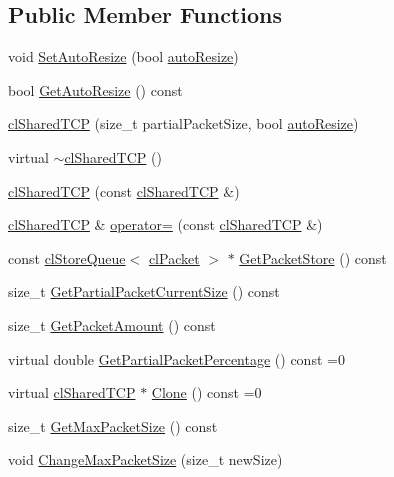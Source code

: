 \subsection*{Public Member Functions}
\begin{DoxyCompactItemize}
\item 
void \hyperlink{classcl_shared_t_c_p_a04c910cf085fe90c1c068e4ab168a7e5}{SetAutoResize} (bool \hyperlink{classcl_shared_t_c_p_aadfbe0c28871af737963ac9205a71a6c}{autoResize})
\item 
bool \hyperlink{classcl_shared_t_c_p_abf8a8bf5fce68d35e34dddec105c8da1}{GetAutoResize} () const 
\item 
\hyperlink{classcl_shared_t_c_p_a5f170f8a147323bb770e170db6789595}{clSharedTCP} (size\_\-t partialPacketSize, bool \hyperlink{classcl_shared_t_c_p_aadfbe0c28871af737963ac9205a71a6c}{autoResize})
\item 
virtual \hyperlink{classcl_shared_t_c_p_a3ace87e7d786ba6cb34dad74f333f5b1}{$\sim$clSharedTCP} ()
\item 
\hyperlink{classcl_shared_t_c_p_adabdc1a14f20fcfca8624b63f4403b87}{clSharedTCP} (const \hyperlink{classcl_shared_t_c_p}{clSharedTCP} \&)
\item 
\hyperlink{classcl_shared_t_c_p}{clSharedTCP} \& \hyperlink{classcl_shared_t_c_p_a4371884780b5f99b014b94f273b54360}{operator=} (const \hyperlink{classcl_shared_t_c_p}{clSharedTCP} \&)
\item 
const \hyperlink{classcl_store_queue}{clStoreQueue}$<$ \hyperlink{classcl_packet}{clPacket} $>$ $\ast$ \hyperlink{classcl_shared_t_c_p_a3879fd59719106ee3b75fee47a0e289f}{GetPacketStore} () const 
\item 
size\_\-t \hyperlink{classcl_shared_t_c_p_abf78a0f2aec1c39029fb1535ed15feca}{GetPartialPacketCurrentSize} () const 
\item 
size\_\-t \hyperlink{classcl_shared_t_c_p_a4a2620ffef0e145c3200acf88c4732aa}{GetPacketAmount} () const 
\item 
virtual double \hyperlink{classcl_shared_t_c_p_ad0781613810b204660f212d37b8c1ce2}{GetPartialPacketPercentage} () const =0
\item 
virtual \hyperlink{classcl_shared_t_c_p}{clSharedTCP} $\ast$ \hyperlink{classcl_shared_t_c_p_a6fa0b7a67bec9b647a7318a093385c72}{Clone} () const =0
\item 
size\_\-t \hyperlink{classcl_shared_t_c_p_a6122b8fd7b395f2b02e96cace26c6857}{GetMaxPacketSize} () const 
\item 
void \hyperlink{classcl_shared_t_c_p_a481e6add10e776f8a6394001f0b7ec34}{ChangeMaxPacketSize} (size\_\-t newSize)

\end{DoxyCompactItemize}
